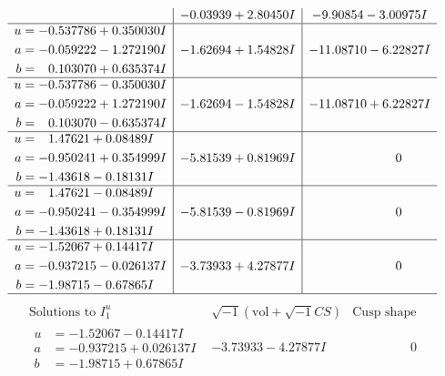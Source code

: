 \documentclass[1p]{elsarticle_modified}
\theoremstyle{definition}
\newcommand{\I}{\sqrt{-1}}
\begin{document}
$$\begin{array}{c|c|c}
 & -0.03939 + 2.80450 I & -9.90854 - 3.00975 I \\ \hline\begin{aligned}
u &= -0.537786 + 0.350030 I \\
a &= -0.059222 - 1.272190 I \\
b &= \phantom{-}0.103070 + 0.635374 I\end{aligned}
 & -1.62694 + 1.54828 I & -11.08710 - 6.22827 I \\ \hline\begin{aligned}
u &= -0.537786 - 0.350030 I \\
a &= -0.059222 + 1.272190 I \\
b &= \phantom{-}0.103070 - 0.635374 I\end{aligned}
 & -1.62694 - 1.54828 I & -11.08710 + 6.22827 I \\ \hline\begin{aligned}
u &= \phantom{-}1.47621 + 0.08489 I \\
a &= -0.950241 + 0.354999 I \\
b &= -1.43618 - 0.18131 I\end{aligned}
 & -5.81539 + 0.81969 I & \phantom{-0.000000 } 0 \\ \hline\begin{aligned}
u &= \phantom{-}1.47621 - 0.08489 I \\
a &= -0.950241 - 0.354999 I \\
b &= -1.43618 + 0.18131 I\end{aligned}
 & -5.81539 - 0.81969 I & \phantom{-0.000000 } 0 \\ \hline\begin{aligned}
u &= -1.52067 + 0.14417 I \\
a &= -0.937215 - 0.026137 I \\
b &= -1.98715 - 0.67865 I\end{aligned}
 & -3.73933 + 4.27877 I & \phantom{-0.000000 } 0\\
 \hline 
 \end{array}$$\newpage$$\begin{array}{c|c|c}  
\text{Solutions to }I^u_{1}& \I (\text{vol} + \sqrt{-1}CS) & \text{Cusp shape}\\
 \hline 
\begin{aligned}
u &= -1.52067 - 0.14417 I \\
a &= -0.937215 + 0.026137 I \\
b &= -1.98715 + 0.67865 I\end{aligned}
 & -3.73933 - 4.27877 I & \phantom{-0.000000 } 0 \\ \hline\begin{aligned}

\end{aligned}
\end{array}$$
\end{document}
